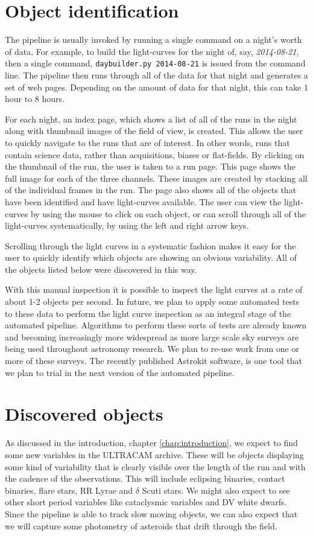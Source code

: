 
\section{Object identification}
The pipeline is usually invoked by running a single command on a night's worth of data. For example, to build the light-curves for the night of, say, \emph{2014-08-21}, then a single command, \texttt{daybuilder.py 2014-08-21} is issued from the command line. The pipeline then runs through all of the data for that night and generates a set of web pages. Depending on the amount of data for that night, this can take 1 hour to 8 hours. 

For each night, an index page, which shows a list of all of the runs in the night along with thumbnail images of the field of view, is created. This allows the user to quickly navigate to the runs that are of interest. In other words, runs that contain science data, rather than acquisitions, biases or flat-fields. By clicking on the thumbnail of the run, the user is taken to a run page. This page shows the full image for each of the three channels. These images are created by stacking all of the individual frames in the run. The page also shows all of the objects that have been identified and have light-curves available. The user can view the light-curves by using the mouse to click on each object, or can scroll through all of the light-curves systematically, by using the left and right arrow keys. 

Scrolling through the light curves in a systematic fashion makes it easy for the user to quickly identify which objects are showing an obvious variability. All of the objects listed below were discovered in this way. 

With this manual inspection it is possible to inspect the light curves at a rate of about 1-2 objects per second. In future, we plan to apply some automated tests to these data to perform the light curve inspection as an integral stage of the automated pipeline. Algorithms to perform these sorts of tests are already known and becoming increasingly more widespread as more large scale sky surveys are being used throughout astronomy research. We plan to re-use work from one or more of these surveys. The recently published Astrokit software, \citep{Astrokit2014} is one tool that we plan to trial in the next version of the automated pipeline. 

\section{Discovered objects}
As discussed in the introduction, chapter \ref{chap:introduction}, we expect to find some new variables in the ULTRACAM archive. These will be objects displaying some kind of variability that is clearly visible over the length of the run and with the cadence of the observations. This will include eclipsing binaries, contact binaries, flare stars, RR Lyrae and $\delta$ Scuti stars. We might also expect to see other short period variables like cataclysmic variables and DV white dwarfs. Since the pipeline is able to track slow moving objects, we can also expect that we will capture some photometry of asteroids that drift through the field.   

